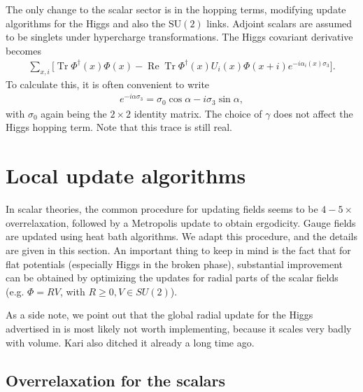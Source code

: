 \documentclass[11pt,a4paper]{article}
\newcommand\RE{\operatorname{Re}}
\newcommand\Tr{\operatorname{Tr}}
\newcommand\he[1]{#1^\dagger}%
\newcommand\gr[1]{\mathrm{#1}}%
\newcommand\lauri[1]{{\color{myorange}#1}}
\begin{document}
The only change to the scalar sector is in the hopping terms, modifying update algorithms for the Higgs and also the $\gr{SU(2)}$ links. \lauri{Adjoint scalars are assumed to be singlets under hypercharge transformations.} The Higgs covariant derivative becomes 
\begin{align}
\sum_{x, i} \Big[ \Tr \he\Phi(x)\Phi(x) - \RE\Tr \he\Phi(x)U_i(x)\Phi(x+i)e^{-i \alpha_i(x)\sigma_3}\Big].
\end{align}
To calculate this, it is often convenient to write 
\begin{align}
e^{-i \alpha\sigma_3} = \sigma_0\cos\alpha - i \sigma_3 \sin\alpha,
\end{align}
with $\sigma_0$ again being the $2\times 2$ identity matrix. The choice of $\gamma$ does not affect the Higgs hopping term. Note that this trace is still real.

\section{Local update algorithms}

In scalar theories, the common procedure for updating fields seems to be $4-5 \times $overrelaxation, followed by a Metropolis update to obtain ergodicity. Gauge fields are updated using heat bath algorithms. We adapt this procedure, and the details are given in this section. An important thing to keep in mind is the fact that for flat potentials (especially Higgs in the broken phase), substantial improvement can be obtained by optimizing the updates for radial parts of the scalar fields (e.g. $\Phi = R V$, with $R \geq 0, V \in SU(2)$). 

As a side note, we point out that the global radial update for the Higgs advertised in \cite{Kajantie:1995kf} is most likely not worth implementing, because it scales very badly with volume. \lauri{Kari also ditched it already a long time ago.}

\subsection{Overrelaxation for the scalars}
\end{document}
